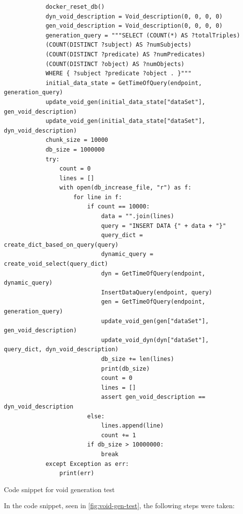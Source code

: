 \begin{listing*}[hbt!]
    \begin{verbatim}
            docker_reset_db()
            dyn_void_description = Void_description(0, 0, 0, 0)
            gen_void_description = Void_description(0, 0, 0, 0)
            generation_query = """SELECT (COUNT(*) AS ?totalTriples) 
            (COUNT(DISTINCT ?subject) AS ?numSubjects)
            (COUNT(DISTINCT ?predicate) AS ?numPredicates)
            (COUNT(DISTINCT ?object) AS ?numObjects) 
            WHERE { ?subject ?predicate ?object . }"""
            initial_data_state = GetTimeOfQuery(endpoint, generation_query)
            update_void_gen(initial_data_state["dataSet"], gen_void_description)
            update_void_gen(initial_data_state["dataSet"], dyn_void_description)
            chunk_size = 10000
            db_size = 1000000
            try:
                count = 0
                lines = []
                with open(db_increase_file, "r") as f:
                    for line in f:
                        if count == 10000:
                            data = "".join(lines)
                            query = "INSERT DATA {" + data + "}"
                            query_dict = create_dict_based_on_query(query)
                            dynamic_query = create_void_select(query_dict)
                            dyn = GetTimeOfQuery(endpoint, dynamic_query)
                            InsertDataQuery(endpoint, query)
                            gen = GetTimeOfQuery(endpoint, generation_query)
                            update_void_gen(gen["dataSet"], gen_void_description)
                            update_void_dyn(dyn["dataSet"], query_dict, dyn_void_description)
                            db_size += len(lines)
                            print(db_size)
                            count = 0
                            lines = []
                            assert gen_void_description == dyn_void_description
                        else:
                            lines.append(line)
                            count += 1
                        if db_size > 10000000:
                            break
            except Exception as err:
                print(err)
    \end{verbatim}
    \caption{Code snippet for \gls{void} generation test}
    \label{fig:void-gen-test}
\end{listing*}

In the code snippet, seen in \autoref{fig:void-gen-test}, the following steps were taken:

